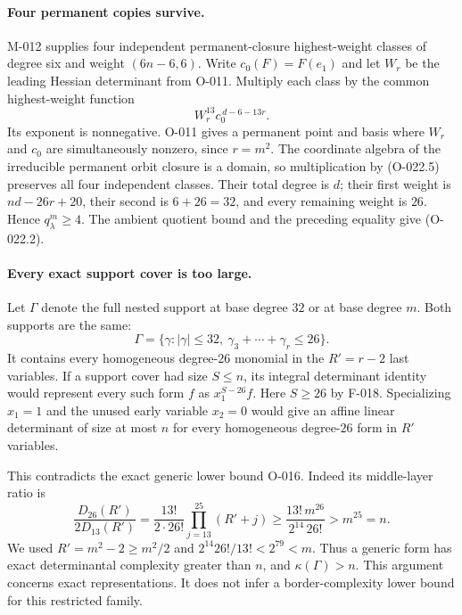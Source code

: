\paragraph{Four permanent copies survive.}
M-012 supplies four independent permanent-closure
highest-weight classes of degree six and weight
$(6n-6,6)$. Write $c_0(F)=F(e_1)$ and let $W_r$
be the leading Hessian determinant from O-011.
Multiply each class by the common highest-weight function
\[
                          W_r^{13}c_0^{\,d-6-13r}.
                                                               \tag{O-022.5}
\]
Its exponent is nonnegative. O-011 gives a permanent
point and basis where $W_r$ and $c_0$ are simultaneously
nonzero, since $r=m^2$. The coordinate algebra of the
irreducible permanent orbit closure is a domain, so
multiplication by (O-022.5) preserves all four independent
classes. Their total degree is $d$; their first weight is
$nd-26r+20$, their second is $6+26=32$, and every
remaining weight is $26$. Hence $q^m_\lambda\geq4$.
The ambient quotient bound and the preceding equality
give (O-022.2).

\paragraph{Every exact support cover is too large.}
Let $\Gamma$ denote the full nested support at base degree
$32$ or at base degree $m$. Both supports are the same:
\[
       \Gamma=\{\gamma:|\gamma|\leq32,\
                            \gamma_3+\cdots+\gamma_r\leq26\}.
                                                               \tag{O-022.6}
\]
It contains every homogeneous degree-$26$ monomial in
the $R'=r-2$ last variables. If a support cover had
size $S\leq n$, its integral determinant identity would
represent every such form $f$ as
$x_1^{S-26}f$. Here $S\geq26$ by F-018.
Specializing $x_1=1$ and the unused early variable $x_2=0$
would give an affine linear determinant of size at most
$n$ for every homogeneous degree-$26$ form in $R'$ variables.

This contradicts the exact generic lower bound O-016.
Indeed its middle-layer ratio is
\[
 \frac{D_{26}(R')}{2D_{13}(R')}
     =\frac{13!}{2\cdot26!}\prod_{j=13}^{25}(R'+j)
     \geq\frac{13!\,m^{26}}{2^{14}\,26!}>m^{25}=n.
                                                               \tag{O-022.7}
\]
We used $R'=m^2-2\geq m^2/2$ and
$2^{14}26!/13!<2^{79}<m$. Thus a generic form has
exact determinantal complexity greater than $n$, and
$\kappa(\Gamma)>n$. This argument concerns exact
representations. It does not infer a border-complexity
lower bound for this restricted family.

